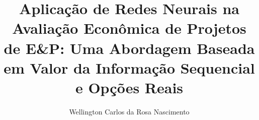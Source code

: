\documentclass[
  phd,
  brazilian
]{ThesisPUC}
\author{Wellington Carlos da Rosa Nascimento}
\title{Aplicação de Redes Neurais na Avaliação Econômica de Projetos de E\&P: Uma Abordagem Baseada em Valor da Informação Sequencial e Opções Reais}
\begin{document}
  
  
  
  \arial
  
  \normalfont
  
\end{document}
